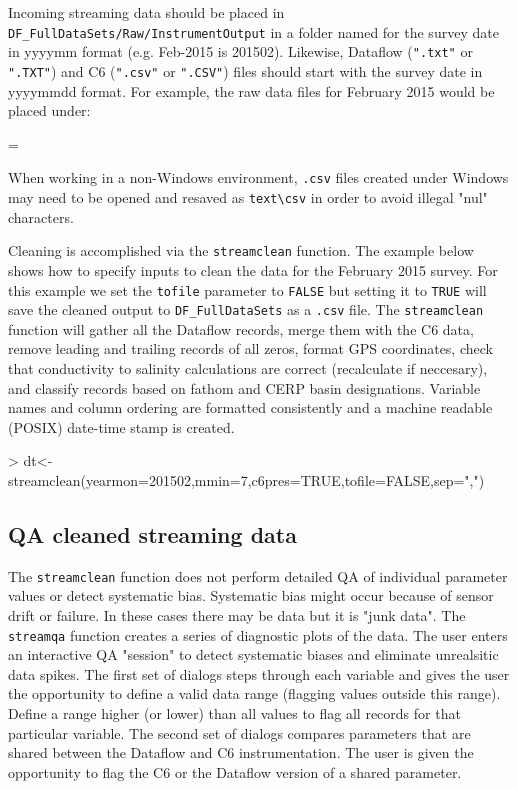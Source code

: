 \documentclass[12pt]{article}
\newenvironment{warning}
{\par\begin{mdframed}[linewidth=2pt,linecolor=red]
\begin{list}{}{\leftmargin=1cm
  \labelwidth=\leftmargin}\item[\Large\ding{43}]}
{\end{list}\end{mdframed}\par}
\begin{document}
Incoming streaming data should be placed in \verb|DF_FullDataSets|\texttt{/Raw/InstrumentOutput} in a folder named for the survey date in yyyymm format (e.g. Feb-2015 is 201502). Likewise, Dataflow (\texttt{".txt"} or \texttt{".TXT"}) and C6 (\texttt{".csv"} or \texttt{".CSV"})  files should start with the survey date in yyyymmdd format. For example, the raw data files for February 2015 would be placed under:


\begin{warning}
When working in a non-Windows environment, \texttt{.csv} files created under Windows may need to be opened and resaved as \texttt{text}\verb|\csv| in order to avoid illegal "nul" characters.
\end{warning}

\vspace{15pt}
Cleaning is accomplished via the \nohyphens{\texttt{streamclean}} function. The example below shows how to specify inputs to clean the data for the February 2015 survey. For this example we set the \texttt{tofile} parameter to \texttt{FALSE} but setting it to \texttt{TRUE} will save the cleaned output to \verb|DF_FullDataSets| as a \texttt{.csv} file. The \texttt{streamclean} function will gather all the Dataflow records, merge them with the C6 data, remove leading and trailing records of all zeros, format GPS coordinates, check that conductivity to salinity calculations are correct (recalculate if neccesary), and classify records based on fathom and CERP basin designations. Variable names and column ordering are formatted consistently and a machine readable (POSIX) date-time stamp is created.   

\begin{Schunk}
\begin{Sinput}
> dt<-streamclean(yearmon=201502,mmin=7,c6pres=TRUE,tofile=FALSE,sep=",")
\end{Sinput}
\end{Schunk}
\subsection{QA cleaned streaming data}

The \texttt{streamclean} function does not perform detailed QA of individual parameter values or detect systematic bias. Systematic bias might occur because of sensor drift or failure. In these cases there may be data but it is "junk data". The \texttt{streamqa} function creates a series of diagnostic plots of the data. The user enters an interactive QA "session" to detect systematic biases and eliminate unrealsitic data spikes. The first set of dialogs steps through each variable and gives the user the opportunity to define a valid data range (flagging values outside this range). Define a range higher (or lower) than all values to flag all records for that particular variable. The second set of dialogs compares parameters that are shared between the Dataflow and C6 instrumentation. The user is given the opportunity to flag the C6 or the Dataflow version of a shared parameter. 
\end{document}
